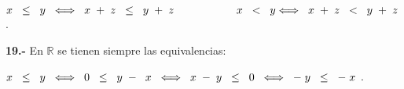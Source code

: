 \documentclass[12pt]{article}
\begin{document}
\hspace{0.5cm}$ x\hspace{0.2cm} \leq \hspace{0.2cm} y\hspace{0.2cm}  \Longleftrightarrow\hspace{0.2cm} x\hspace{0.1cm} + \hspace{0.1cm}z\hspace{0.2cm}\leq\hspace{0.2cm} y\hspace{0.1cm} +\hspace{0.1cm}z \hspace{2cm} x\hspace{0.2cm}<\hspace{0.2cm}y \Longleftrightarrow\hspace{0.2cm} x\hspace{0.1cm}+\hspace{0.1cm}z\hspace{0.2cm}<\hspace{0.2cm}y\hspace{0.1cm}+\hspace{0.1cm}z$.\vspace{0.2cm}

\textbf{19.-} En $\mathbb{R}$ se tienen siempre las equivalencias:
\vspace{0.2cm}

$x\hspace{0.2cm}\leq \hspace{0.2cm}y\hspace{0.2cm} \Longleftrightarrow \hspace{0.2cm} 0 \hspace{0.2cm}\leq\hspace{0.2cm} y \hspace{0.1cm} -\hspace{0.2cm} x\hspace{0.2cm} \Longleftrightarrow \hspace{0.2cm} x\hspace{0.1cm}-\hspace{0.1cm}y\hspace{0.2cm}\leq\hspace{0.2cm}0\hspace{0.2cm}\Longleftrightarrow\hspace{0.2cm}-\hspace{0.1cm}y\hspace{0.2cm} \leq\hspace{0.2cm}-\hspace{0.1cm}x$ \vspace{0.1cm}.
\end{document}
